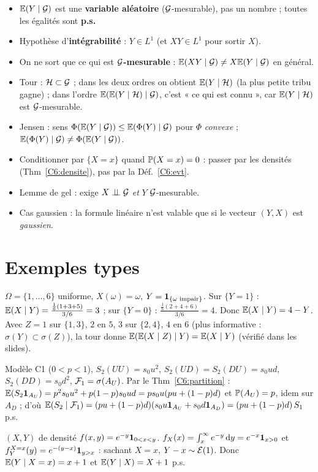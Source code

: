 \documentclass[11pt,a4paper]{article}
\begin{document}
\begin{piege}
\begin{itemize}
  \item $\mathbb{E}(Y\mid\mathcal{G})$ est une \textbf{variable aléatoire} ($\mathcal{G}$-mesurable), pas un nombre ; toutes les égalités sont \textbf{p.s.}
  \item Hypothèse d'\textbf{intégrabilité} : $Y\in L^1$ (et $XY\in L^1$ pour sortir $X$).
  \item On ne sort que ce qui est \textbf{$\mathcal{G}$-mesurable} : $\mathbb{E}(XY\mid\mathcal{G})\neq X\mathbb{E}(Y\mid\mathcal{G})$ en général.
  \item Tour : $\mathcal{H}\subset\mathcal{G}$ ; dans les deux ordres on obtient $\mathbb{E}(Y\mid\mathcal{H})$ (la plus petite tribu gagne) ; dans l'ordre $\mathbb{E}(\mathbb{E}(Y\mid\mathcal{H})\mid\mathcal{G})$, c'est « ce qui est connu », car $\mathbb{E}(Y\mid\mathcal{H})$ est $\mathcal{G}$-mesurable.
  \item Jensen : sens $\Phi(\mathbb{E}(Y\mid\mathcal{G}))\le\mathbb{E}(\Phi(Y)\mid\mathcal{G})$ pour $\Phi$ \emph{convexe} ; $\mathbb{E}(\Phi(Y)\mid\mathcal{G})\neq\Phi(\mathbb{E}(Y\mid\mathcal{G}))$.
  \item Conditionner par $\{X=x\}$ quand $\mathbb{P}(X=x)=0$ : passer par les densités (Thm~\ref{C6:densite}), pas par la Déf.~\ref{C6:evt}.
  \item Lemme de gel : exige $X\perp\!\!\!\perp\mathcal{G}$ \emph{et} $Y$ $\mathcal{G}$-mesurable.
  \item Cas gaussien : la formule linéaire n'est valable que si le vecteur $(Y,X)$ est \emph{gaussien}.
\end{itemize}
\end{piege}

\section*{Exemples types}

\begin{exemple}[dé, slides]\label{C6:ex-de}
$\Omega=\{1,\dots,6\}$ uniforme, $X(\omega)=\omega$, $Y=\mathbf{1}_{\{\omega\text{ impair}\}}$. Sur $\{Y=1\}$ :
$\mathbb{E}(X\mid Y)=\frac{\frac16(1+3+5)}{3/6}=3$ ; sur $\{Y=0\}$ : $\frac{\frac16(2+4+6)}{3/6}=4$. Donc $\mathbb{E}(X\mid Y)=4-Y$.
Avec $Z=1$ sur $\{1,3\}$, $2$ en $5$, $3$ sur $\{2,4\}$, $4$ en $6$ (plus informative : $\sigma(Y)\subset\sigma(Z)$), la tour donne $\mathbb{E}(\mathbb{E}(X\mid Z)\mid Y)=\mathbb{E}(X\mid Y)$ (vérifié dans les slides).
\end{exemple}

\begin{exemple}\label{C6:ex-arbre}
Modèle C1 ($0<p<1$), $S_2(UU)=s_0u^2$, $S_2(UD)=S_2(DU)=s_0ud$, $S_2(DD)=s_0d^2$, $\mathcal{F}_1=\sigma(A_U)$. Par le Thm~\ref{C6:partition} :
$\mathbb{E}(S_2\mathbf{1}_{A_U})=p^2s_0u^2+p(1-p)s_0ud=ps_0u(pu+(1-p)d)$ et $\mathbb{P}(A_U)=p$, idem sur $A_D$ ; d'où
$\mathbb{E}(S_2\mid\mathcal{F}_1)=(pu+(1-p)d)(s_0u\mathbf{1}_{A_U}+s_0d\mathbf{1}_{A_D})=(pu+(1-p)d)\,S_1$ p.s.
\end{exemple}

\begin{exemple}[densité]\label{C6:ex-densite}
$(X,Y)$ de densité $f(x,y)=e^{-y}\mathbf{1}_{0<x<y}$. $f_X(x)=\int_x^{\infty}e^{-y}\,\mathrm{d} y=e^{-x}\mathbf{1}_{x>0}$ et
$f_Y^{X=x}(y)=e^{-(y-x)}\mathbf{1}_{y>x}$ : sachant $X=x$, $Y-x\sim\mathcal{E}(1)$. Donc $\mathbb{E}(Y\mid X=x)=x+1$ et $\mathbb{E}(Y\mid X)=X+1$ p.s.
\end{exemple}
\end{document}
